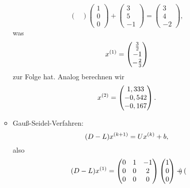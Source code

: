 \documentclass{exercise}
\begin{document}
\begin{enumerate}
\begin{itemize}
\[\begin{pmatrix}
                \end{pmatrix}\begin{pmatrix}
                    1\\
                    0\\
                    0
                \end{pmatrix} + \begin{pmatrix}
                    3\\
                    5\\
                    -1
                \end{pmatrix} = \begin{pmatrix}
                    3\\
                    4\\
                    -2
                \end{pmatrix},
            \]
            was
            \[
                x^{\parentheses*{1}} = \begin{pmatrix}
                    \frac{3}{2}\\
                    -1\\
                    -\frac{2}{3}
                \end{pmatrix}
            \]
            zur Folge hat.
            Analog berechnen wir
            \[
                x^{\parentheses*{2}} = \begin{pmatrix}
                    1,333\\
                    -0,542\\
                    -0,167
                \end{pmatrix}.
            \]
            \item Gauß-Seidel-Verfahren:
            \[
                \parentheses*{D - L}x^{\parentheses*{k + 1}} = Ux^{\parentheses*{k}} + b,
            \]
            also
            \[
                \parentheses*{D - L}x^{\parentheses*{1}} = \begin{pmatrix}
                    0 & 1 & -1\\
                    0 & 0 & 2\\
                    0 & 0 & 0
                \end{pmatrix}\begin{pmatrix}
                    1\\
                    0\\
                    0
                \end{pmatrix} + \begin{pmatrix}

\end{pmatrix}\]
\end{itemize}
\end{enumerate}
\end{document}
